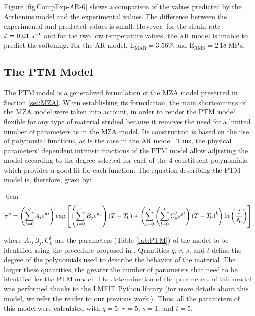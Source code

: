 \documentclass[metals,article,accept,pdftex,moreauthors]{Definitions/mdpi}
\DeclareRobustCommand{\mdot}[1]{\accentset{\mbox{\bfseries .}}{#1}}
\DeclareRobustCommand{\RMSE}{\text{E}_\text{RMS}}
\DeclareRobustCommand{\MARE}{\text{E}_\text{MAR}}
\DeclareRobustCommand{\ps}{\text{s}^{-1}}
\DeclareRobustCommand{\MPa}{\text{MPa}}
\begin{document}
Figure \ref{fig:CompExp-AR-6} shows a comparison of the values predicted by the Arrhenius model and the experimental values.
The difference between the experimental and predicted values is small.
However, for the strain rate $\mdot\varepsilon = 0.01~\ps$ and for the two low temperature values, the AR model is unable to predict the softening.
For the AR model, $\MARE=3.56\%$ and $\RMSE=2.18~\MPa$.


\subsection{The PTM Model\label{sec:PTM}}

The PTM model \cite{TizeMha-2022} is a generalized formulation of the MZA model presented in Section \ref{sec:MZA}.
When establishing its formulation, the main shortcomings of the MZA model were taken into account, in order to render the PTM model flexible for any type of material studied because it removes the need for a limited number of parameters as in the MZA model.
Its construction is based on the use of polynomial functions, as is the case in the AR model.
Thus, the physical parameters' dependent intrinsic functions of the PTM model allow adjusting the model according to the degree selected for each of the 4 constituent polynomials, which provides a good fit for each function.
The equation describing the PTM model is, therefore, given by:

\begin{adjustwidth}{-\extralength}{0cm}
\begin{equation}
\label{eq:PTM-model}
\sigma^y = \left(\sum_{i=0}^{q}{A_i{\varepsilon^p}^{i}}\right) \exp\left[\left(\sum_{j=0}^{r}{B_j{\varepsilon^p}^{j}}\right)\left(T-T_0\right) + \left(\sum_{k=0}^{s}\left(\sum_{l=0}^{t}{C_k^l{\varepsilon^p}^{l}} \right)\left(T-T_0\right)^k \right)\ln\left( \frac{\mdot\varepsilon}{\mdot{\varepsilon}_0}\right)\right]
\end{equation}
\end{adjustwidth}
\vspace{6pt}
where $A_i, B_j, C_k^l$ are the parameters (Table \ref{tab:PTM}) of the model to be identified using the procedure proposed in \cite{TizeMha-2022}.
Quantities $q$, $r$, $s$, and $t$ define the degree of the polynomials used to describe the behavior of the material.
The larger these quantities, the greater the number of parameters that need to be identified for the PTM model.
The determination of the parameters of this model was performed thanks to the LMFIT Python library \cite{Newville-2016} (for more details about this model, we refer the reader to our previous work \cite{TizeMha-2022}).
Thus, all the parameters of this model were calculated with $q=5$, $r=5$, $s=1$, and $t=5$.
\end{document}
